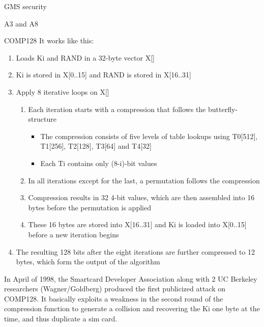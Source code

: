 \begin{section}{GMS security}
\begin{subsection}{A3 and A8}
\begin{subsubsection}{COMP128}
        It works like this:
        \begin{enumerate}
          \item Loads Ki and RAND in a 32-byte vector X[]
          \item Ki is stored in X[0..15] and RAND is stored in X[16..31]
          \item Apply 8 iterative loops on X[]
            \begin{enumerate}
              \item Each iteration starts with a compression that follows the butterfly-structure
                \begin{itemize}
                  \item The compression consists of five levels of table lookups using T0[512], T1[256], T2[128], T3[64] and T4[32]
                  \item Each Ti contains only (8-i)-bit values
                \end{itemize}
              \item In all iterations except for the last, a permutation follows the compression
              \item Compression results in 32 4-bit values, which are then assembled into 16 bytes before the permutation is
                applied
              \item These 16 bytes are stored into X[16..31] and Ki is loaded into X[0..15] before a new iteration begins
            \end{enumerate}
          \item The resulting 128 bits after the eight iterations are further compressed to 12 bytes, which form the
            output of the algorithm
        \end{enumerate}

        In April of 1998, the Smartcard Developer Association along with 2 UC Berkeley researchers
        (Wagner/Goldberg) produced the first publicized attack on COMP128.
        It basically exploits a weakness in the second round of the compression function to generate
        a collision and recovering the Ki one byte at the time, and thus duplicate a sim card.
      \end{subsubsection}
    \end{subsection}


\end{section}

